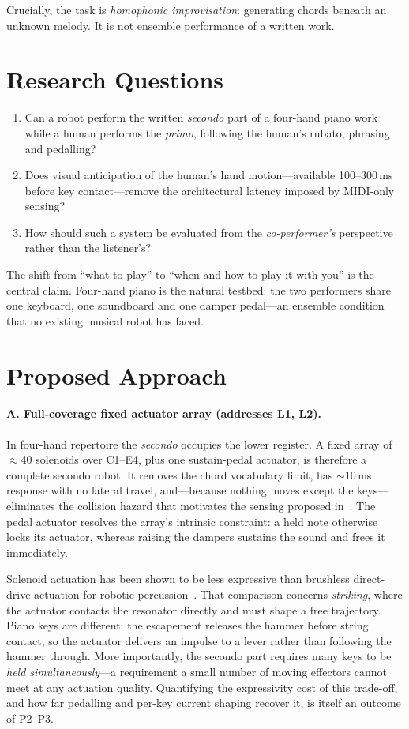 \documentclass[11pt]{article}
\begin{document}
Crucially, the task is \emph{homophonic improvisation}: generating chords beneath an unknown melody.
It is not ensemble performance of a written work.

\section{Research Questions}
\begin{enumerate}[label=\textbf{RQ\arabic*.}]
  \item Can a robot perform the written \emph{secondo} part of a four-hand piano work while a human
        performs the \emph{primo}, following the human's rubato, phrasing and pedalling?
  \item Does visual anticipation of the human's hand motion---available 100--300\,ms before key
        contact---remove the architectural latency imposed by MIDI-only sensing?
  \item How should such a system be evaluated from the \emph{co-performer's} perspective rather than
        the listener's?
\end{enumerate}

The shift from ``what to play'' to ``when and how to play it with you'' is the central claim.
Four-hand piano is the natural testbed: the two performers share one keyboard, one soundboard and
one damper pedal---an ensemble condition that no existing musical robot has faced.

\section{Proposed Approach}

\paragraph{A. Full-coverage fixed actuator array (addresses L1, L2).}
In four-hand repertoire the \emph{secondo} occupies the lower register. A fixed array of
$\approx$40 solenoids over C1--E4, plus one sustain-pedal actuator, is therefore a complete
secondo robot. It removes the chord vocabulary limit, has $\sim$10\,ms response with no lateral
travel, and---because nothing moves except the keys---eliminates the collision hazard that motivates
the sensing proposed in~\cite{wang2024cooperative}. The pedal actuator resolves the array's
intrinsic constraint: a held note otherwise locks its actuator, whereas raising the dampers
sustains the sound and frees it immediately.

Solenoid actuation has been shown to be less expressive than brushless direct-drive actuation for
robotic percussion~\cite{nime2020bldc}. That comparison concerns \emph{striking}, where the
actuator contacts the resonator directly and must shape a free trajectory. Piano keys are different:
the escapement releases the hammer before string contact, so the actuator delivers an impulse to a
lever rather than following the hammer through. More importantly, the secondo part requires many
keys to be \emph{held simultaneously}---a requirement a small number of moving effectors cannot
meet at any actuation quality. Quantifying the expressivity cost of this trade-off, and how far
pedalling and per-key current shaping recover it, is itself an outcome of P2--P3.
\end{document}
